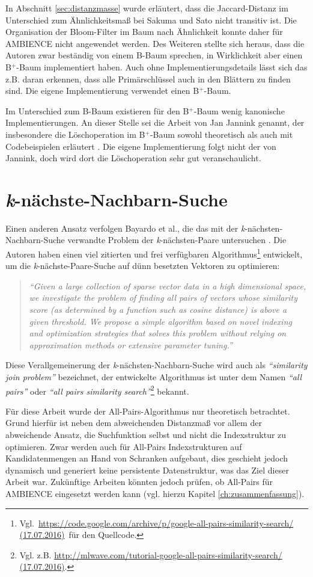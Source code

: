 In Abschnitt \ref{sec:distanzmasse} wurde erläutert, dass die Jaccard-Distanz im Unterschied zum Ähnlichkeitsmaß bei Sakuma und Sato nicht transitiv ist. Die Organisation der Bloom-Filter im Baum nach Ähnlichkeit konnte daher für AMBIENCE nicht angewendet werden. Des Weiteren stellte sich heraus, dass die Autoren zwar beständig von einem B-Baum sprechen, in Wirklichkeit aber einen B$^+$-Baum implementiert haben. Auch ohne Implementierungsdetails lässt sich das z.B. daran erkennen, dass alle Primärschlüssel auch in den Blättern zu finden sind. Die eigene Implementierung verwendet einen B$^+$-Baum. 

Im Unterschied zum B-Baum existieren für den B$^+$-Baum wenig kanonische Implementierungen. An dieser Stelle sei die Arbeit von Jan Jannink genannt, der insbesondere die Löschoperation im B$^+$-Baum sowohl theoretisch als auch mit Codebeispielen erläutert \cite{Jannink1995}. Die eigene Implementierung folgt nicht der von Jannink, doch wird dort die Löschoperation sehr gut veranschaulicht. 
\section{\textit{k}-nächste-Nachbarn-Suche}\label{sec:bloom-knn}
Einen anderen Ansatz verfolgen Bayardo et al., die das mit der \textit{k}-nächsten-Nachbarn-Suche verwandte Problem der \textit{k}-nächsten-Paare untersuchen \cite{Bayardo2007}. Die Autoren haben einen viel zitierten und frei verfügbaren Algorithmus\footnote{\mbox{Vgl. \url{https://code.google.com/archive/p/google-all-pairs-similarity-search/ (17.07.2016)} für} den Quell\-code.} entwickelt, um die \textit{k}-nächste-Paare-Suche auf dünn besetzten Vektoren zu optimieren: 
\begin{quote}
\textit{"`Given a large collection of sparse vector data in a high dimensional space, we investigate the problem of finding all pairs of vectors whose similarity score (as determined by a function such as cosine distance) is above a given threshold. We propose a simple algorithm based on novel indexing and optimization strategies that solves this problem without relying on approximation methods or extensive parameter tuning."'} \cite{Bayardo2007}
\end{quote}
Diese Verallgemeinerung der \textit{k}-nächsten-Nachbarn-Suche wird auch als \textit{"`similarity join problem"'} \cite{Bayardo2007} bezeichnet, der entwickelte Algorithmus ist unter dem Namen \textit{"`all pairs"'} oder \textit{"`all pairs similarity search"'}\footnote{Vgl. z.B. \url{http://mlwave.com/tutorial-google-all-pairs-similarity-search/ (17.07.2016)}.} bekannt. 

Für diese Arbeit wurde der All-Pairs-Algorithmus nur theoretisch betrachtet. Grund hierfür ist neben dem abweichenden Distanzmaß vor allem der abweichende Ansatz, die Suchfunktion selbst und nicht die Indexstruktur zu optimieren. Zwar werden auch für All-Pairs Indexstrukturen auf Kandidatenmengen an Hand von Schranken aufgebaut, dies geschieht jedoch dynamisch und generiert keine persistente Datenstruktur, was das Ziel dieser Arbeit war. Zukünftige Arbeiten könnten jedoch prüfen, ob All-Pairs für AMBIENCE eingesetzt werden kann (vgl. hierzu Kapitel \ref{ch:zusammenfassung}). 